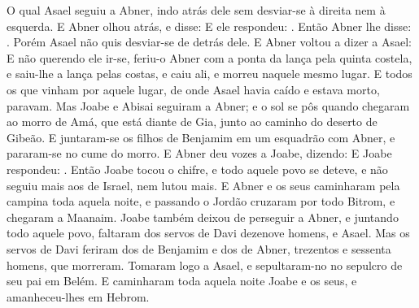 {  O qual Asael seguiu a Abner, indo atrás dele sem desviar-se à direita nem à esquerda.
  E Abner olhou atrás, e disse:  E ele respondeu: .
  Então Abner lhe disse: . Porém Asael não quis desviar-se de detrás dele.
  E Abner voltou a dizer a Asael: 
  E não querendo ele ir-se, feriu-o Abner com a ponta da lança pela quinta costela, e saiu-lhe a lança pelas costas, e caiu ali, e morreu naquele mesmo lugar. E todos os que vinham por aquele lugar, de onde Asael havia caído e estava morto, paravam.
  Mas Joabe e Abisai seguiram a Abner; e o sol se pôs quando chegaram ao morro de Amá, que está diante de Gia, junto ao caminho do deserto de Gibeão.
  E juntaram-se os filhos de Benjamim em um esquadrão com Abner, e pararam-se no cume do morro.
  E Abner deu vozes a Joabe, dizendo: 
  E Joabe respondeu: .
  Então Joabe tocou o chifre, e todo aquele povo se deteve, e não seguiu mais aos de Israel, nem lutou mais.
  E Abner e os seus caminharam pela campina toda aquela noite, e passando o Jordão cruzaram por todo Bitrom, e chegaram a Maanaim.
  Joabe também deixou de perseguir a Abner, e juntando todo aquele povo, faltaram dos servos de Davi dezenove homens, e Asael.
  Mas os servos de Davi feriram dos de Benjamim e dos de Abner, trezentos e sessenta homens, que morreram. Tomaram logo a Asael, e sepultaram-no no sepulcro de seu pai em Belém.
  E caminharam toda aquela noite Joabe e os seus, e amanheceu-lhes em Hebrom.
\par }

